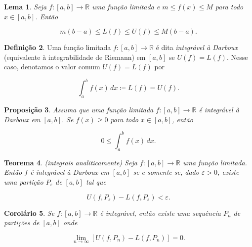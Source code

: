 \documentclass[12pt]{article}
\theoremstyle{plain}
\newtheorem{thm}{Teorema}[section]
\newtheorem{prop}[thm]{Proposição}
\newtheorem{lem}[thm]{Lema}
\newtheorem{cor}[thm]{Corolário}
\theoremstyle{definition}
\newtheorem{defn}[thm]{Definição}
\theoremstyle{remark}
\begin{document}
\begin{lem}
    Seja \(f : [a,b] \to \mathbb{R}\) uma função limitada e \(m \leq f(x) \leq M\) para todo \(x \in [a,b]\). Então

    \begin{equation}
        m(b-a) \leq L(f) \leq U(f) \leq M(b-a).
     \end{equation}
\end{lem}

\begin{defn}
    Uma função limitada \(f : [a,b] \to \mathbb{R}\) é dita \emph{integrável à Darboux} (equivalente à integrabilidade de Riemann) em \([a,b]\) se \(U(f) = L(f)\). Nesse caso, denotamos o valor comum \(U(f) = L(f)\) por

    \begin{equation}
        \int_a^b f(x) \, dx \coloneq L(f) = U(f).
    \end{equation}
\end{defn}

\begin{prop}
    Assuma que uma função limitada \(f : [a,b] \to \mathbb{R}\) é integrável à Darboux em \([a,b]\). Se \(f(x) \geq 0\) para todo \(x \in [a,b]\), então

    \begin{equation}
        0 \leq \int_a^b f(x) \, dx.
    \end{equation}
\end{prop}

\begin{thm} (integrais analiticamente)
    Seja \(f: [a,b] \to \mathbb{R}\) uma função limitada. Então \(f\) é integrável à Darboux em \([a,b]\) se e somente se, dado \(\varepsilon > 0\), existe uma partição \(P_\varepsilon\) de \([a,b]\) tal que

    \begin{equation}
        U(f, P_\varepsilon) - L(f, P_\varepsilon) < \varepsilon.
    \end{equation}
\end{thm}

\begin{cor}
    Se \(f : [a,b] \to \mathbb{R}\) é integrável, então existe uma sequência \(P_n\) de partições de \([a,b]\) onde

    \begin{equation}
        \lim_{n \to \infty} \left[ U(f, P_n) - L(f, P_n) \right] = 0.
    \end{equation}
\end{cor}
\end{document}
